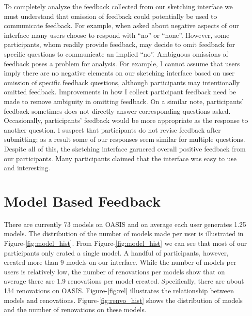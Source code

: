 To completely analyze the feedback collected from our sketching interface we must understand that omission of feedback could potentially be used to communicate feedback.
For example, when asked about negative aspects of our interface many users choose to respond with ``no'' or ``none''.
However, some participants, whom readily provide feedback, may decide to omit feedback for specific questions to communicate an implied ``no''.
Ambiguous omissions of feedback poses a problem for analysis. 
For example, I cannot assume that users imply there are no negative elements on our sketching interface based on user omission of specific feedback questions, although participants may intentionally omitted feedback.
Improvements in how I collect participant feedback need be made to remove ambiguity in omitting feedback.
On a similar note, participants' feedback sometimes does not directly answer corresponding questions asked.
Occasionally, participants' feedback would be more appropriate as the response to another question.
I suspect that participants do not revise feedback after submitting; as a result some of our responses seem similar for multiple questions. \\

Despite all of this, the sketching interface garnered overall positive feedback from our participants.
Many participants claimed that the interface was easy to use and interesting.
 
\section{Model Based Feedback}

There are currently 73 models on OASIS and on average each user generates 1.25 models.
The distribution of the number of models made per user is illustrated in Figure-\ref{fig:model_hist}.
From Figure-\ref{fig:model_hist} we can see that most of our participants only crated a single model.
A handful of participants, however, created more than 9 models on our interface.
While the number of models per users is relatively low, the number of renovations per models show that on average there are 1.9 renovations per model created.
Specifically, there are about 134 renovations on OASIS.
Figure-\ref{fig:rel} illustrates the relationship between models and renovations.
Figure-\ref{fig:renvo_hist} shows the distribution of models and the number of renovations on these models.
 
